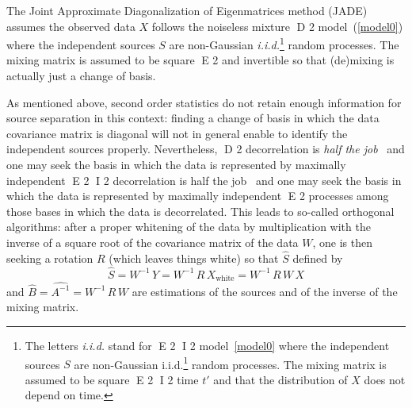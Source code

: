 The Joint Approximate Diagonalization of Eigenmatrices method (JADE) assumes the observed data $X$ follows the noiseless mixture 
D 2
model~(\ref{model0}) where the independent sources $S$ are non-Gaussian \emph{i.i.d.}\footnote{The letters \emph{i.i.d.} stand for 
E 2
I 2
model~\eqref{model0} where the independent sources $S$ are non-Gaussian i.i.d.\footnote{The letters i.i.d. stand for 
E 2
independently and identically distributed meaning that each entries of $X$ at a given time $t$ are independent of $X$ at any other 
D 2
time $t'$ and that the distribution of $X$ does not depend on time. } random processes. The mixing matrix is assumed to be square 
E 2
I 2
time $t'$ and that the distribution of $X$ does not depend on time.} random processes. The mixing matrix is assumed to be square 
E 2
and invertible so that (de)mixing is actually just a change of basis.

As mentioned above, second order statistics do not retain enough information for source separation in this context: finding a change of 
basis in which the data covariance matrix is diagonal will not in general enable to identify the independent sources properly. Nevertheless, 
D 2
decorrelation is \emph{half the job}~\citep{ica:tutorial} and one may seek the basis in which the data is represented by maximally independent 
E 2
I 2
decorrelation is half the job~\citep{ica:tutorial} and one may seek the basis in which the data is represented by maximally independent 
E 2
processes among those bases in which the data is decorrelated. This leads to so-called orthogonal algorithms: after a proper whitening of 
the data by multiplication with the inverse of a square root of the covariance matrix of the data $W$, one is then seeking a rotation $R$ 
(which leaves things white) so that $\hat{ S}$ defined by
\begin{equation}
\hat{ S} = W^{-1} \, Y =  W^{-1}\, R \, X_{\textrm{white}}  = W^{-1}\, R \, W \, X 
\end{equation}
and $\hat{B} = \widehat{A^{-1}} =  W^{-1}\, R \, W$ are estimations of the sources and of the inverse of the mixing matrix.\\

